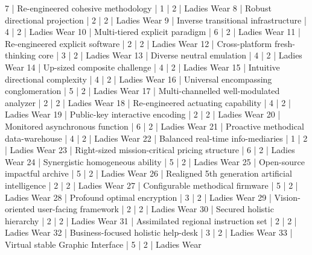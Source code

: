 \begin{enumerate}
\begin{pseudo*}
       7 | Re-engineered cohesive methodology               |        1 |      2 | Ladies Wear   
       8 | Robust directional projection                    |        2 |      2 | Ladies Wear   
       9 | Inverse transitional infrastructure              |        4 |      2 | Ladies Wear   
      10 | Multi-tiered explicit paradigm                   |        6 |      2 | Ladies Wear   
      11 | Re-engineered explicit software                  |        2 |      2 | Ladies Wear   
      12 | Cross-platform fresh-thinking core               |        3 |      2 | Ladies Wear   
      13 | Diverse neutral emulation                        |        4 |      2 | Ladies Wear   
      14 | Up-sized composite challenge                     |        4 |      2 | Ladies Wear   
      15 | Intuitive directional complexity                 |        4 |      2 | Ladies Wear   
      16 | Universal encompassing conglomeration            |        5 |      2 | Ladies Wear   
      17 | Multi-channelled well-modulated analyzer         |        2 |      2 | Ladies Wear   
      18 | Re-engineered actuating capability               |        4 |      2 | Ladies Wear   
      19 | Public-key interactive encoding                  |        2 |      2 | Ladies Wear   
      20 | Monitored asynchronous function                  |        6 |      2 | Ladies Wear   
      21 | Proactive methodical data-warehouse              |        4 |      2 | Ladies Wear   
      22 | Balanced real-time info-mediaries                |        1 |      2 | Ladies Wear   
      23 | Right-sized mission-critical pricing structure   |        6 |      2 | Ladies Wear   
      24 | Synergistic homogeneous ability                  |        5 |      2 | Ladies Wear   
      25 | Open-source impactful archive                    |        5 |      2 | Ladies Wear   
      26 | Realigned 5th generation artificial intelligence |        2 |      2 | Ladies Wear   
      27 | Configurable methodical firmware                 |        5 |      2 | Ladies Wear   
      28 | Profound optimal encryption                      |        3 |      2 | Ladies Wear   
      29 | Vision-oriented user-facing framework            |        2 |      2 | Ladies Wear   
      30 | Secured holistic hierarchy                       |        2 |      2 | Ladies Wear   
      31 | Assimilated regional instruction set             |        2 |      2 | Ladies Wear   
      32 | Business-focused holistic help-desk              |        3 |      2 | Ladies Wear   
      33 | Virtual stable Graphic Interface                 |        5 |      2 | Ladies Wear   

\end{pseudo*}
\end{enumerate}
